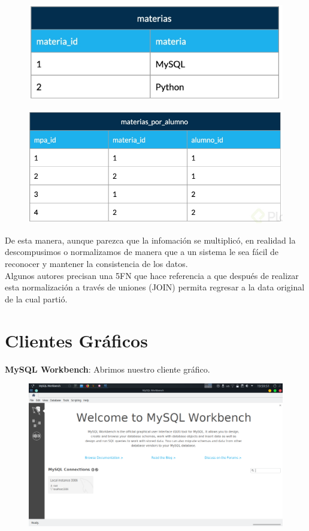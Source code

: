 \documentclass{article}
\begin{document}
\begin{figure}[h!]
    \centering
      \includegraphics[scale=0.5]{./Pictures/034_normalizacion.png}
\end{figure}

\begin{figure}[h!]
    \centering
      \includegraphics[scale=0.5]{./Pictures/035_normalizacion.png}
\end{figure}

De esta manera, aunque parezca que la infomación se multiplicó, en realidad la
descompusimos o normalizamos de manera que a un sistema le sea fácil de
reconocer y mantener la consistencia de los datos.\\

Algunos autores precisan una 5FN que hace referencia a que después de realizar
esta normalización a través de uniones (JOIN) permita regresar a la data
original de la cual partió.

\newpage

\section{Clientes Gráficos}%
\textbf{MySQL Workbench}: Abrimos nuestro cliente gráfico.
\begin{figure}[h!]
  \centering
  \includegraphics[scale=0.47]{./Pictures/036_workbench.png}
\end{figure}
\end{document}
